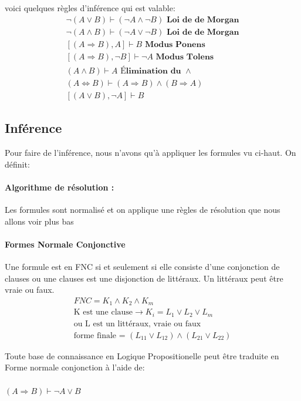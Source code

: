 \documentclass[oneside]{book}
\begin{document}
voici quelques règles d'inférence qui est valable:
\begin{align}
\neg(A\vee B) \vdash (\neg A\wedge \neg B) \textbf{      Loi de de Morgan}\\
\neg(A\wedge B) \vdash (\neg A \vee \neg B) \textbf{       Loi de de Morgan}\\
[(A \Rightarrow B), A] \vdash B \textbf{        Modus Ponens}\\
[(A \Rightarrow B), \neg B] \vdash \neg A \textbf{        Modus Tolens}\\
(A \wedge B) \vdash A \textbf{       Élimination du } \wedge\\
(A \Leftrightarrow B) \vdash (A\Rightarrow B) \wedge (B\Rightarrow A)\\
[(A \vee B), \neg A] \vdash B
\end{align}

\subsection{Inférence}
Pour faire de l'inférence, nous n'avons qu'à appliquer les formules vu ci-haut. On définit:
\paragraph{Algorithme de résolution :} Les formules sont normalisé et on applique une règles de résolution que nous allons voir plus bas

\paragraph{Formes Normale Conjonctive} Une formule est en FNC si et seulement si elle consiste d'une conjonction de clauses ou une clauses est une disjonction de littéraux. Un littéraux peut être vraie ou faux.
\begin{align}
FNC = K_1 \wedge K_2 \wedge K_m \\
\text{K est une clause} \rightarrow K_i = L_1 \vee L_2 \vee L_m\\
\text{ou L est un littéraux, vraie ou faux}\\
\text{forme finale = } (L_{11}\vee L_{12})\wedge (L_{21} \vee L_{22})
\end{align} 

\noindent Toute base de connaissance en Logique Propositionelle peut être traduite en Forme normale conjonction à l'aide de:\\ \\
\centering
$(A \Rightarrow B) \vdash \neg A \vee B$
\justify
\end{document}
